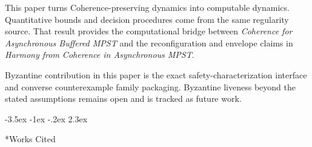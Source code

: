 \documentclass[a4paper,10pt,twocolumn,english]{article}
\makeatletter
\renewcommand{\section}{\@startsection{section}{1}{\z@}%
  {-3.5ex \@plus -1ex \@minus -.2ex}%
  {2.3ex}%
  {\raggedright\normalfont\large\bfseries}}
\numberwithin{equation}{section}
\theoremstyle{paperdef}
\theoremstyle{paperplain}
\theoremstyle{paperdef}
\theoremstyle{paperremark}
\makeatother
\begin{document}
This paper turns Coherence-preserving dynamics into computable dynamics. Quantitative bounds and decision procedures come from the same regularity source. That result provides the computational bridge between \emph{Coherence for Asynchronous Buffered MPST} and the reconfiguration and envelope claims in \emph{Harmony from Coherence in Asynchronous MPST}.

Byzantine contribution in this paper is the exact safety-characterization interface and converse counterexample family packaging. Byzantine liveness beyond the stated assumptions remains open and is tracked as future work.

\section*{Works Cited}
\end{document}

